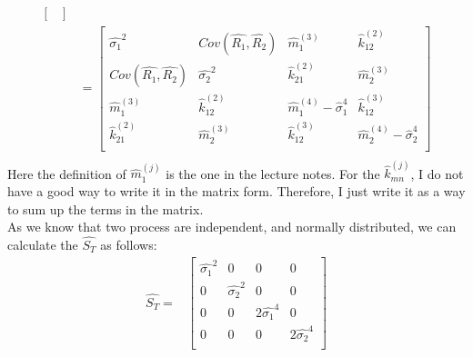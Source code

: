 \begin{enumerate}[(a)]
\begin{equation*}
\begin{aligned}
{\begin{bmatrix}
    \end{bmatrix}} \\
    & = {\begin{bmatrix}
      \hat{\sigma_1}^2 & Cov(\hat{R_1},\hat{R_2}) & \hat{m}_1^{(3)} & \hat{k}_{12}^{(2)}\\
      Cov(\hat{R_1},\hat{R_2}) & \hat{\sigma_2}^2 & \hat{k}_{21}^{(2)} & \hat{m}_2^{(3)}\\
      \hat{m}_1^{(3)} & \hat{k}_{12}^{(2)} & \hat{m}_1^{(4)} - \hat{\sigma}_1^4 & \hat{k}_{12}^{(3)}\\
      \hat{k}_{21}^{(2)} & \hat{m}_2^{(3)} & \hat{k}_{12}^{(3)} & \hat{m}_2^{(4)} - \hat{\sigma}_2^4\\
      \end{bmatrix}} \\
  \end{aligned}
\end{equation*}
Here the definition of $\hat{m}_1^{(j)}$ is the one in the lecture notes. For the $\hat{k}_{mn}^{(j)}$, I do not have a good way to write it in the matrix form. Therefore, I just write it as a way to sum up the terms in the matrix.\\

As we know that two process are independent, and normally distributed, we can calculate the $\hat{S_T}$ as follows:
\begin{equation*}
  \begin{aligned}
    \hat{S_T} = & \begin{bmatrix}
      \hat{\sigma_1}^2 & 0 & 0 & 0\\
      0 & \hat{\sigma_2}^2 & 0 & 0\\
      0 & 0 & 2\hat{\sigma_1}^4 & 0 \\
      0 & 0 & 0 & 2\hat{\sigma_2}^4 \\
    \end{bmatrix} \\
  \end{aligned}
\end{equation*}


\end{enumerate}
